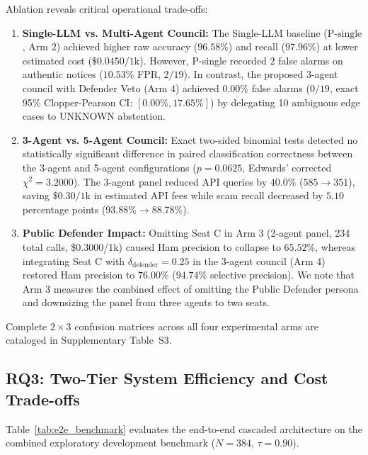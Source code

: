 \documentclass[journal]{IEEEtran}
\begin{document}
Ablation reveals critical operational trade-offs:
\begin{enumerate}
    \item \textbf{Single-LLM vs. Multi-Agent Council:} The Single-LLM baseline ($\text{P-single}$, Arm 2) achieved higher raw accuracy ($96.58\%$) and recall ($97.96\%$) at lower estimated cost ($\$0.0450/1\text{k}$). However, P-single recorded $2$ false alarms on authentic notices ($10.53\%$ FPR, $2/19$). In contrast, the proposed 3-agent council with Defender Veto (Arm 4) achieved $0.00\%$ false alarms ($0/19$, exact 95\% Clopper-Pearson CI: $[0.00\%, 17.65\%]$) by delegating 10 ambiguous edge cases to UNKNOWN abstention.
    \item \textbf{3-Agent vs. 5-Agent Council:} Exact two-sided binomial tests detected no statistically significant difference in paired classification correctness between the 3-agent and 5-agent configurations ($p = 0.0625$, Edwards' corrected $\chi^2 = 3.2000$). The 3-agent panel reduced API queries by $40.0\%$ ($585 \to 351$), saving $\$0.30/1\text{k}$ in estimated API fees while scam recall decreased by $5.10$ percentage points ($93.88\% \to 88.78\%$).
    \item \textbf{Public Defender Impact:} Omitting Seat C in Arm 3 (2-agent panel, 234 total calls, \$0.3000/1k) caused Ham precision to collapse to $65.52\%$, whereas integrating Seat C with $\delta_{\text{defender}} = 0.25$ in the 3-agent council (Arm 4) restored Ham precision to $76.00\%$ ($94.74\%$ selective precision). We note that Arm 3 measures the combined effect of omitting the Public Defender persona and downsizing the panel from three agents to two seats.
\end{enumerate}

Complete $2 \times 3$ confusion matrices across all four experimental arms are cataloged in Supplementary Table~S3.

\subsection{RQ3: Two-Tier System Efficiency and Cost Trade-offs}
\label{subsec:res_rq3}

Table~\ref{tab:e2e_benchmark} evaluates the end-to-end cascaded architecture on the combined exploratory development benchmark ($N=384$, $\tau=0.90$).
\end{document}
